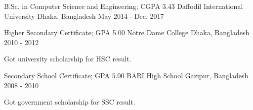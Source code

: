 
\begin{cventries}
  \cventry
    {B.Sc. in Computer Science and Engineering; CGPA 3.43}
    {Daffodil International University}
    {Dhaka, Bangladesh}
    {May 2014 - Dec. 2017}
    {}


  \cventry
    {Higher Secondary Certificate; GPA 5.00}
    {Notre Dame College}
    {Dhaka, Bangladesh}
    {2010 - 2012}
    {
      \begin{cvitems}
        \item {Got university scholarship for HSC result.}
      \end{cvitems}
    }


  \cventry
    {Secondary School Certificate; GPA 5.00}
    {BARI High School}
    {Gazipur, Bangladesh}
    {2008 - 2010}
    {
      \begin{cvitems}
        \item {Got government scholarship for SSC result.}
      \end{cvitems}
    }
\end{cventries}
